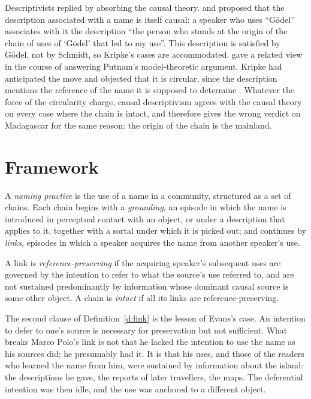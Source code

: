 \documentclass{situationist-preprint}
\begin{document}
Descriptivists replied by absorbing the causal theory. \citet{Kroon1987} and \citet{Jackson1998} proposed that the description associated with a name is itself causal: a speaker who uses \enquote{G\"odel} associates with it the description \enquote{the person who stands at the origin of the chain of uses of \enquote{G\"odel} that led to my use}. This description is satisfied by G\"odel, not by Schmidt, so Kripke's cases are accommodated. \citet{Lewis1984} gave a related view in the course of answering Putnam's model-theoretic argument. Kripke had anticipated the move and objected that it is circular, since the description mentions the reference of the name it is supposed to determine \citep[Lecture~II]{Kripke1980}. Whatever the force of the circularity charge, causal descriptivism agrees with the causal theory on every case where the chain is intact, and therefore gives the wrong verdict on Madagascar for the same reason: the origin of the chain is the mainland.

\section{Framework}

\begin{definition}\label{d:practice}
A \emph{naming practice} is the use of a name in a community, structured as a set of chains. Each chain begins with a \emph{grounding}, an episode in which the name is introduced in perceptual contact with an object, or under a description that applies to it, together with a sortal under which it is picked out; and continues by \emph{links}, episodes in which a speaker acquires the name from another speaker's use.
\end{definition}

\begin{definition}\label{d:link}
A link is \emph{reference-preserving} if the acquiring speaker's subsequent uses are governed by the intention to refer to what the source's use referred to, and are not sustained predominantly by information whose dominant causal source is some other object. A chain is \emph{intact} if all its links are reference-preserving.
\end{definition}

The second clause of Definition~\ref{d:link} is the lesson of Evans's case. An intention to defer to one's source is necessary for preservation but not sufficient. What breaks Marco Polo's link is not that he lacked the intention to use the name as his sources did; he presumably had it. It is that his uses, and those of the readers who learned the name from him, were sustained by information about the island: the descriptions he gave, the reports of later travellers, the maps. The deferential intention was then idle, and the use was anchored to a different object.
\end{document}
